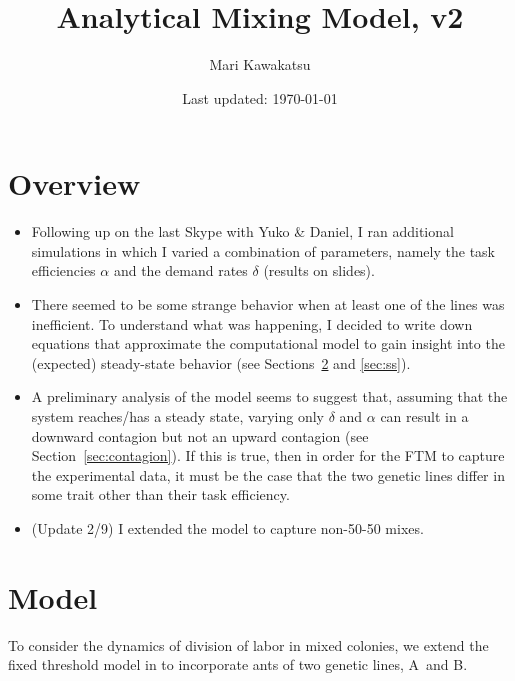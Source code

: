 \documentclass[10pt]{article}
\title{\LARGE Analytical Mixing Model, v2\vspace{-10pt}}
\author{Mari Kawakatsu\vspace{-15pt}}
\date{Last updated: \today\vspace{-15pt}}
\newcommand{\A}{{\color{red}A}}
\newcommand{\B}{{\color{blue}B}}
\begin{document}
\maketitle

\tableofcontents
\section{Overview}
\begin{itemize}
    \item Following up on the last Skype with Yuko \& Daniel, I ran additional simulations in which I varied a combination of parameters, namely the task efficiencies $\alpha$ and the demand rates $\delta$ (results on slides).
    
    \item There seemed to be some strange behavior when at least one of the lines was inefficient. To understand what was happening, I decided to write down equations that approximate the computational model to gain insight into the (expected) steady-state behavior (see Sections~\ref{sec:model} and \ref{sec:ss}).
    
    \item A preliminary analysis of the model seems to suggest that, assuming that the system reaches/has a steady state, varying only $\delta$ and $\alpha$ can result in a downward contagion but not an upward contagion (see Section~\ref{sec:contagion}). If this is true, then in order for the FTM to capture the experimental data, it must be the case that the two genetic lines differ in some trait other than their task efficiency.
    
    \item (Update 2/9) I extended the model to capture non-50-50 mixes.
    
\end{itemize}

\section{Model} \label{sec:model}

To consider the dynamics of division of labor in mixed colonies, we extend the fixed threshold model in \cite{ulrich18} to incorporate ants of two genetic lines, \A\ and \B. 
\end{document}
